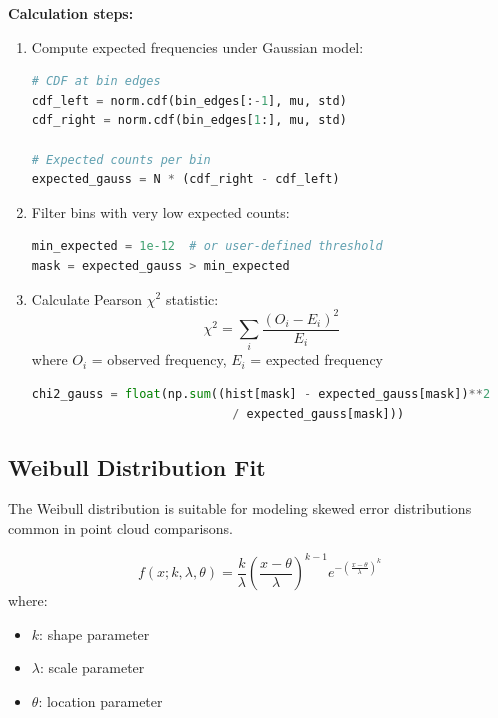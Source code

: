 \documentclass[12pt]{article}
\begin{document}
\textbf{Calculation steps:}
\begin{enumerate}
    \item Compute expected frequencies under Gaussian model:
    \begin{lstlisting}[language=Python]
# CDF at bin edges
cdf_left = norm.cdf(bin_edges[:-1], mu, std)
cdf_right = norm.cdf(bin_edges[1:], mu, std)

# Expected counts per bin
expected_gauss = N * (cdf_right - cdf_left)
    \end{lstlisting}

    \item Filter bins with very low expected counts:
    \begin{lstlisting}[language=Python]
min_expected = 1e-12  # or user-defined threshold
mask = expected_gauss > min_expected
    \end{lstlisting}

    \item Calculate Pearson $\chi^2$ statistic:
    \begin{equation}
        \chi^2 = \sum_{i} \frac{(O_i - E_i)^2}{E_i}
    \end{equation}
    where $O_i$ = observed frequency, $E_i$ = expected frequency
    \begin{lstlisting}[language=Python]
chi2_gauss = float(np.sum((hist[mask] - expected_gauss[mask])**2 
                            / expected_gauss[mask]))
    \end{lstlisting}
\end{enumerate}

\subsection{Weibull Distribution Fit}
The Weibull distribution is suitable for modeling skewed error distributions common in point cloud comparisons.

\begin{equation}
    f(x; k, \lambda, \theta) = \frac{k}{\lambda}\left(\frac{x-\theta}{\lambda}\right)^{k-1} e^{-\left(\frac{x-\theta}{\lambda}\right)^k}
\end{equation}
where:
\begin{itemize}
    \item $k$: shape parameter
    \item $\lambda$: scale parameter
    \item $\theta$: location parameter
\end{itemize}
\end{document}

